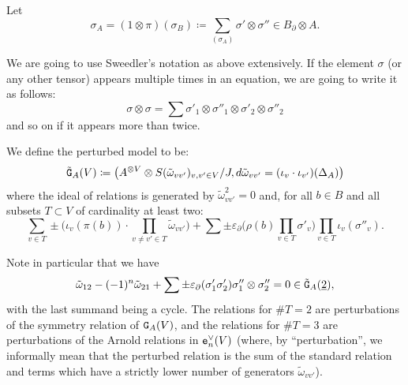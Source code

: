 Let
\begin{equation}
  \sigma_{A} = (1 \otimes \pi)(\sigma_{B}) \coloneqq \sum_{(\sigma_{A})} \sigma' \otimes \sigma'' \in B_{\partial} \otimes A.
\end{equation}

\begin{remark}
  We are going to use Sweedler's notation as above extensively.
  If the element $\sigma$ (or any other tensor) appears multiple times in an equation, we are going to write it as follows:
  \[ \sigma \otimes \sigma = \sum \sigma'_{1} \otimes \sigma''_{1} \otimes \sigma'_{2} \otimes \sigma''_{2} \]
  and so on if it appears more than twice.
\end{remark}

We define the perturbed model to be:
\begin{equation}
  \label{cnfbnd.eq.perturbed-model}
  \tilde{\mathtt{G}}_{A}(V) \coloneq \bigl( A^{\otimes V} \otimes S(\tilde\omega_{vv'})_{v,v' \in V} / J, d \tilde\omega_{vv'} = (\iota_{v} \cdot \iota_{v'})(\Delta_{A}) \bigr)
\end{equation}
where the ideal of relations is generated by $\tilde\omega_{vv'}^{2} = 0$ and, for all $b \in B$ and all subsets $T \subset V$ of cardinality at least two:
\begin{equation}
  \sum_{v \in T} \pm \bigl( \iota_{v}(\pi(b)) \cdot \prod_{v \neq v' \in T} \tilde\omega_{vv'} \bigr) + \sum \pm \varepsilon_{\partial} \bigl( \rho(b) \prod_{v \in T} \sigma'_{v} \bigr) \prod_{v \in T} \iota_{v}(\sigma''_{v}).
\end{equation}

Note in particular that we have
\begin{equation}
  \tilde\omega_{12} - (-1)^{n} \tilde\omega_{21} + \sum \pm \varepsilon_{\partial}(\sigma'_{1} \sigma'_{2}) \sigma''_{1} \otimes \sigma''_{2} = 0 \in \tilde{\mathtt{G}}_{A}(\underline{2}),
\end{equation}
with the last summand being a cycle.
The relations for $\# T = 2$ are perturbations of the symmetry relation of $\mathtt{G}_{A}(V)$, and the relations for $\# T = 3$ are perturbations of the Arnold relations in $\mathtt{e}_{n}^{\vee}(V)$ (where, by ``perturbation'', we informally mean that the perturbed relation is the sum of the standard relation and terms which have a strictly lower number of generators $\tilde\omega_{vv'}$).

